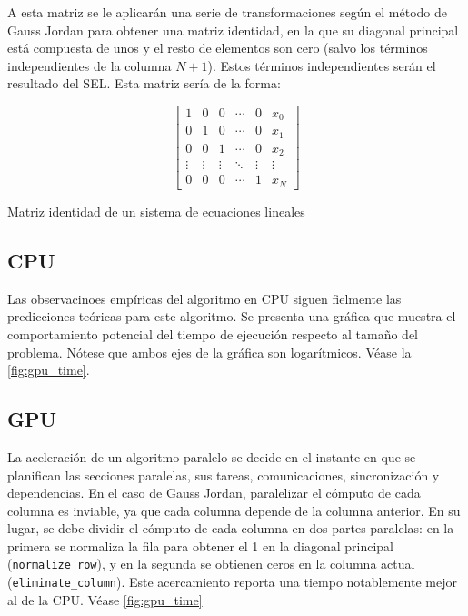 A esta matriz se le aplicarán una serie de transformaciones según el método
de Gauss Jordan para obtener una matriz identidad,
en la que su diagonal principal está compuesta de unos y el resto de elementos
son cero (salvo los términos independientes de la columna $N+1$).
Estos términos independientes serán el resultado del SEL.
Esta matriz sería de la forma:

\begin{mycapequ}[h]
\begin{equation}
    \begin{bmatrix}
        1 & 0 & 0 & \cdots & 0 & x_0 \\
        0 & 1 & 0 & \cdots & 0 & x_1 \\
        0 & 0 & 1 & \cdots & 0 & x_2 \\
        \vdots & \vdots & \vdots & \ddots & \vdots & \vdots \\
        0 & 0 & 0 & \cdots & 1 & x_N
    \end{bmatrix}
\end{equation}
\caption{Matriz identidad de un sistema de ecuaciones lineales}
\label{eq:sel_identity}
\end{mycapequ}

\subsection{CPU}

Las observacinoes empíricas del algoritmo en CPU siguen fielmente
las predicciones teóricas para este algoritmo.
Se presenta una gráfica que muestra el comportamiento potencial
del tiempo de ejecución respecto al tamaño del problema.
Nótese que ambos ejes de la gráfica son logarítmicos.
Véase la \autoref{fig:gpu_time}.

\subsection{GPU}

La aceleración de un algoritmo paralelo se decide
en el instante en que se planifican las secciones paralelas,
sus tareas, comunicaciones, sincronización y dependencias.
En el caso de Gauss Jordan, paralelizar el cómputo
de cada columna es inviable, ya que cada columna
depende de la columna anterior.
En su lugar, se debe dividir el cómputo de cada columna
en dos partes paralelas: en la primera se normaliza la fila
para obtener el 1 en la diagonal principal
(\texttt{normalize\_row}),
y en la segunda se obtienen ceros en la columna actual
(\texttt{eliminate\_column}).
Este acercamiento reporta una tiempo notablemente mejor
al de la CPU. Véase \ref{fig:gpu_time}


